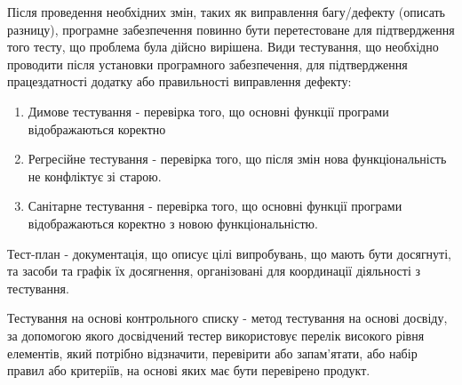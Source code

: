 Після проведення необхідних змін, таких як виправлення багу/дефекту (описать разницу), програмне забезпечення повинно бути перетестоване для підтвердження того тесту, що проблема була дійсно вирішена. Види тестування, що необхідно проводити після установки програмного забезпечення, для підтвердження працездатності додатку або правильності виправлення дефекту:

\begin{enumerate}
    \item Димове тестування - перевірка того, що основні функції програми відображаються коректно
    \item Регресійне тестування - перевірка того, що після змін нова функціональність не конфліктує зі старою.
    \item Санітарне тестування - перевірка того, що основні функції програми відображаються коректно з новою функціональністю.
\end{enumerate} 

Тест-план - документація, що описує цілі випробувань, що мають бути досягнуті, та засоби та графік їх досягнення, організовані для координації діяльності з тестування.

Тестування на основі контрольного списку - метод тестування на основі досвіду, за допомогою якого досвідчений тестер використовує перелік високого рівня елементів, який потрібно відзначити, перевірити або запам'ятати, або набір правил або критеріїв, на основі яких має бути перевірено продукт. \cite{istqb}

